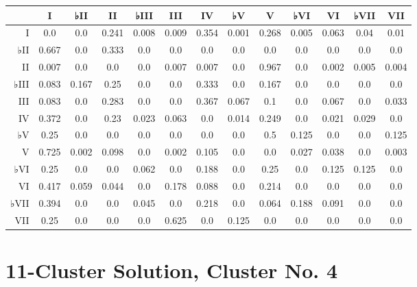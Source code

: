 \begin{table}[htbp]
\begin{minipage}{\linewidth}
\setlength{\tymax}{0.5\linewidth}
\centering
\small
\begin{tabulary}{\textwidth}{@{}RCCCCCCCCCCCC@{}} \toprule
&I&♭II&II&♭III&III&IV&♭V&V&♭VI&VI&♭VII&VII\\
\midrule
I&0.0&0.0&0.241&0.008&0.009&0.354&0.001&0.268&0.005&0.063&0.04&0.01\\
♭II&0.667&0.0&0.333&0.0&0.0&0.0&0.0&0.0&0.0&0.0&0.0&0.0\\
II&0.007&0.0&0.0&0.0&0.007&0.007&0.0&0.967&0.0&0.002&0.005&0.004\\
♭III&0.083&0.167&0.25&0.0&0.0&0.333&0.0&0.167&0.0&0.0&0.0&0.0\\
III&0.083&0.0&0.283&0.0&0.0&0.367&0.067&0.1&0.0&0.067&0.0&0.033\\
IV&0.372&0.0&0.23&0.023&0.063&0.0&0.014&0.249&0.0&0.021&0.029&0.0\\
♭V&0.25&0.0&0.0&0.0&0.0&0.0&0.0&0.5&0.125&0.0&0.0&0.125\\
V&0.725&0.002&0.098&0.0&0.002&0.105&0.0&0.0&0.027&0.038&0.0&0.003\\
♭VI&0.25&0.0&0.0&0.062&0.0&0.188&0.0&0.25&0.0&0.125&0.125&0.0\\
VI&0.417&0.059&0.044&0.0&0.178&0.088&0.0&0.214&0.0&0.0&0.0&0.0\\
♭VII&0.394&0.0&0.0&0.045&0.0&0.218&0.0&0.064&0.188&0.091&0.0&0.0\\
VII&0.25&0.0&0.0&0.0&0.625&0.0&0.125&0.0&0.0&0.0&0.0&0.0\\

\bottomrule

\end{tabulary}
\end{minipage}
\end{table}

\section{11-Cluster Solution, Cluster No. 4}
\label{11-clustersolutionclusterno.4}

